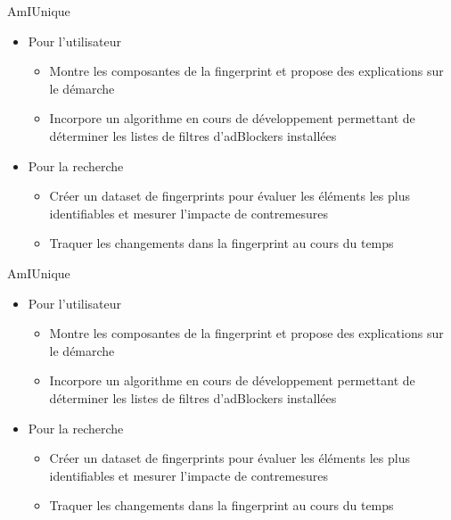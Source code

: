 \documentclass{beamer}
\begin{document}
	\begin{frame}{AmIUnique}
		\begin{itemize}
			\item Pour l'utilisateur
			\begin{itemize}
				\color{gray}
				\item Montre les composantes de la fingerprint et propose des explications sur le démarche
				\color{black}
				\item Incorpore un algorithme en cours de développement permettant de déterminer  les listes de filtres d'adBlockers installées
			\end{itemize}
			\color{lightgray}
			\item Pour la recherche
			\begin{itemize}
				\color{lightgray}
				\item Créer un dataset de fingerprints pour évaluer les éléments les plus identifiables et mesurer l'impacte de contremesures
				\item Traquer les changements dans la fingerprint au cours du temps
			\end{itemize}
		\end{itemize}
	\end{frame}

	\begin{frame}{AmIUnique}
		\begin{itemize}
			\color{gray}
			\item Pour l'utilisateur
			\begin{itemize}
				\color{gray}
				\item Montre les composantes de la fingerprint et propose des explications sur le démarche
				\item Incorpore un algorithme en cours de développement permettant de déterminer  les listes de filtres d'adBlockers installées
			\end{itemize}
			\color{black}\item Pour la recherche
			\begin{itemize}
				\item Créer un dataset de fingerprints pour évaluer les éléments les plus identifiables et mesurer l'impacte de contremesures
				\item \color{lightgray} Traquer les changements dans la fingerprint au cours du temps
			\end{itemize}
		\end{itemize}
	\end{frame}
\end{document}
